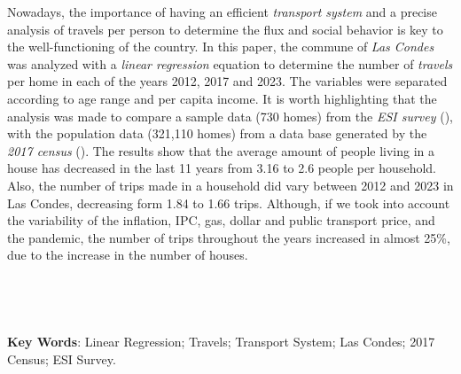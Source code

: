 \documentclass[12pt]{article} %
\begin{document}
\begin{titlepage}
\begin{justify}
    Nowadays, the importance of having an efficient \textit{transport 
    system} and a precise analysis of travels per person to 
    determine the flux and social behavior is key to the 
    well-functioning of the country.  In this paper, the commune 
    of \textit{Las Condes} was analyzed with a \textit{linear regression} equation to 
    determine the number of \textit{travels} per home in each of the years 2012, 
    2017 and 2023. The variables were separated according to age range 
    and per capita income. It is worth highlighting that the analysis 
    was made to compare a sample data (730 homes) from the \textit{ESI survey} (\textbf{\cite{esi}}), with the population data (321,110 homes)
    from a data base generated by the \textit{2017 census} (\textbf{\cite{censo2017}}). 
    The results show that the average amount of people living in a house has decreased 
    in the last 11 years from 3.16 to 2.6 people per household. Also, the number of trips 
    made in a household did vary between 2012 and 2023 in Las Condes, decreasing form 
    1.84 to 1.66 trips. Although, if we took into account the variability of the inflation, IPC, gas, dollar and public transport price, 
    and the pandemic, the number of trips throughout the years increased in almost 25\%, due to the increase in the number of houses. 
    \\ \\ \\ \\ \\
    \textbf{Key Words}: Linear Regression; Travels; Transport System; Las Condes; 2017 Census; ESI Survey.
\end{justify}


\vspace{1cm}

\end{titlepage}

\end{document}
